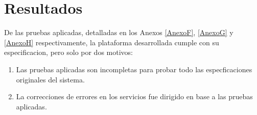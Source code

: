 \section{Resultados}
De las pruebas aplicadas, detalladas en los Anexos \ref{AnexoF}, \ref{AnexoG} y \ref{AnexoH} respectivamente, la plataforma desarrollada cumple con su especificacion, pero solo por dos motivos:
\begin{enumerate}
	\item Las pruebas aplicadas son incompletas para probar todo las especficaciones originales del sistema.
    \item La correcciones de errores en los servicios fue dirigido en base a las pruebas aplicadas.
\end{enumerate}
